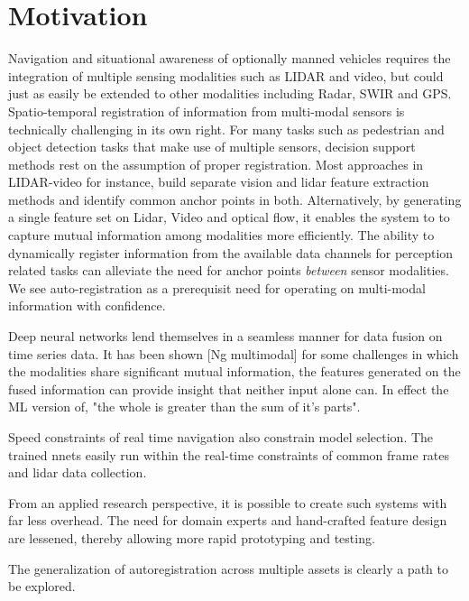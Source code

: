 \documentclass{article}
\begin{document}
\section{Motivation} %
\label{sec:motivation}
Navigation and situational awareness of optionally manned vehicles requires the integration of multiple sensing modalities such as LIDAR and video, but could just as easily be extended to other modalities including Radar, SWIR and GPS. Spatio-temporal registration of information from multi-modal sensors is technically challenging in its own right. For many tasks such as pedestrian and object detection tasks that make use of multiple sensors, decision support methods rest on the assumption of proper registration. Most approaches \cite{Bodensteiner2012Real-time-} in LIDAR-video for instance, build separate vision and lidar feature extraction methods and identify common anchor points in both. Alternatively, by generating a single feature set on Lidar, Video and optical flow, it enables the system to to capture mutual information among modalities more efficiently. The ability to dynamically register information from the available data channels for perception related tasks can alleviate the need for anchor points \emph{between} sensor modalities. We see auto-registration as a prerequisit need for operating on multi-modal information with confidence.

Deep neural networks lend themselves in a seamless manner for data fusion on time series data. It has been shown [Ng multimodal] for some challenges in which the modalities share significant mutual information, the features generated on the fused information can provide insight that neither input alone can. In effect the ML version of, "the whole is greater than the sum of it's parts". 

Speed constraints of real time navigation also constrain model selection. The trained nnets easily run within the real-time constraints of common frame rates and lidar data collection.

From an applied research perspective, it is possible to create such systems with far less overhead. The need for domain experts and hand-crafted feature design are lessened, thereby allowing more rapid prototyping and testing. 

The generalization of autoregistration across multiple assets is clearly a path to be explored. 
\end{document}
